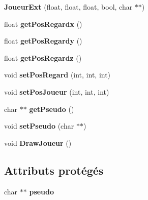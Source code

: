 \begin{DoxyCompactItemize}
\item 
\hypertarget{classJoueurExt_a6aaf4d501909088035eab7c30976c56b}{{\bfseries Joueur\-Ext} (float, float, float, bool, char $\ast$$\ast$)}\label{classJoueurExt_a6aaf4d501909088035eab7c30976c56b}

\item 
\hypertarget{classJoueurExt_a6b42376ef9dad3b028fe60452eac9ae2}{float {\bfseries get\-Pos\-Regardx} ()}\label{classJoueurExt_a6b42376ef9dad3b028fe60452eac9ae2}

\item 
\hypertarget{classJoueurExt_a6b7ca10441fe1bd4ae6b5bbfdf569a24}{float {\bfseries get\-Pos\-Regardy} ()}\label{classJoueurExt_a6b7ca10441fe1bd4ae6b5bbfdf569a24}

\item 
\hypertarget{classJoueurExt_adc14d839661cc6cdedb3cdd5b408adb4}{float {\bfseries get\-Pos\-Regardz} ()}\label{classJoueurExt_adc14d839661cc6cdedb3cdd5b408adb4}

\item 
\hypertarget{classJoueurExt_ac199a3646acea6924888e3bff11875f1}{void {\bfseries set\-Pos\-Regard} (int, int, int)}\label{classJoueurExt_ac199a3646acea6924888e3bff11875f1}

\item 
\hypertarget{classJoueurExt_a0d96b0535c075451f879839944c831fa}{void {\bfseries set\-Pos\-Joueur} (int, int, int)}\label{classJoueurExt_a0d96b0535c075451f879839944c831fa}

\item 
\hypertarget{classJoueurExt_ace7030a94124f4053c25644a095ae536}{char $\ast$$\ast$ {\bfseries get\-Pseudo} ()}\label{classJoueurExt_ace7030a94124f4053c25644a095ae536}

\item 
\hypertarget{classJoueurExt_ace82d1687f7c862e03f99f1d52bb8b74}{void {\bfseries set\-Pseudo} (char $\ast$$\ast$)}\label{classJoueurExt_ace82d1687f7c862e03f99f1d52bb8b74}

\item 
\hypertarget{classJoueurExt_a3f4da3fc59fc11dfea1ae62d7fc7dd7f}{void {\bfseries Draw\-Joueur} ()}\label{classJoueurExt_a3f4da3fc59fc11dfea1ae62d7fc7dd7f}

\end{DoxyCompactItemize}
\subsection*{Attributs protégés}
\begin{DoxyCompactItemize}
\item 
\hypertarget{classJoueurExt_a7a17662c22b6575d3497beca9510bbaf}{char $\ast$$\ast$ {\bfseries pseudo}}\label{classJoueurExt_a7a17662c22b6575d3497beca9510bbaf}

\end{DoxyCompactItemize}


